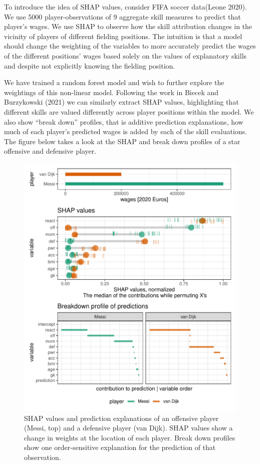 \documentclass[
  11,
]{article}
\begin{document}
To introduce the idea of SHAP values, consider FIFA soccer data(Leone 2020). We use 5000 player-observations of 9 aggregate skill measures to predict that player's wages. We use SHAP to observe how the skill attribution changes in the vicinity of players of different fielding positions. The intuition is that a model should change the weighting of the variables to more accurately predict the wages of the different positions' wages based solely on the values of explanatory skills and despite not explicitly knowing the fielding position.

We have trained a random forest model and wish to further explore the weightings of this non-linear model. Following the work in Biecek and Burzykowski (2021) we can similarly extract SHAP values, highlighting that different skills are valued differently across player positions within the model. We also show ``break down'' profiles, that is additive prediction explanations, how much of each player's predicted wages is added by each of the skill evaluations. The figure below takes a look at the SHAP and break down profiles of a star offensive and defensive player.

\begin{figure}

{\centering \includegraphics[width=1\linewidth]{figures/cheem_fifa_messi_dijk} 

}

\caption{SHAP values and prediction explanations of an offensive player (Messi, top) and a defensive player (van Dijk). SHAP values show a change in weights at the location of each player. Break down profiles show one order-sensitive explanation for the prediction of that observation.}\label{fig:cheemShapBd}
\end{figure}
\end{document}

